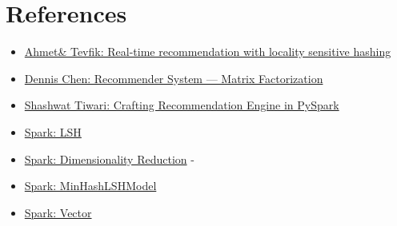 \documentclass{scrartcl}
\begin{document}
\section{References}
\begin{itemize}
  \item \href{https://doi.org/10.1007/s10844-019-00552-1}{Ahmet\& Tevfik: Real-time recommendation with locality sensitive hashing}
  \item \href{https://towardsdatascience.com/recommendation-system-matrix-factorization-d61978660b4b}{Dennis Chen: Recommender System — Matrix Factorization}
  \item \href{https://medium.com/analytics-vidhya/crafting-recommendation-engine-in-pyspark-a7ca242ad40a}{Shashwat Tiwari: Crafting Recommendation Engine in PySpark}
  \item \href{https://spark.apache.org/docs/2.2.3/ml-features.html#locality-sensitive-hashing}{Spark: LSH}
  \item \href{https://spark.apache.org/docs/2.2.0/mllib-dimensionality-reduction.html}{Spark: Dimensionality Reduction}
- \item \href{https://spark.apache.org/docs/latest/api/python/reference/api/pyspark.ml.feature.MinHashLSHModel.html#pyspark.ml.feature.MinHashLSHModel.approxNearestNeighbors}{Spark: MinHashLSHModel}
  \item \href{https://spark.apache.org/docs/1.1.0/mllib-data-types.html}{Spark: Vector}
\end{itemize}
\end{document}
